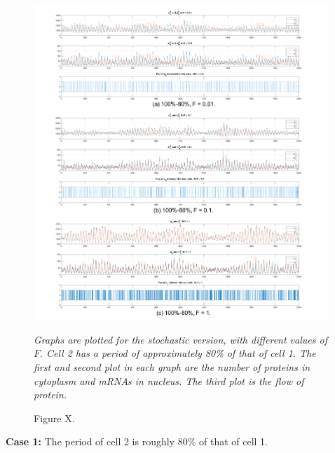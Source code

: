 \documentclass[12pt]{article}
\renewcommand{\(}{\left (}
\renewcommand{\)}{\right )}
\begin{document}
 \begin{figure}[!]
    \centering
	\begin{minipage}{0.99\textwidth}
		\centering
		\includegraphics[width=0.99\textwidth]{sto_two_80_100_compare.png}
		\caption*{\small Figure X.}
	\end{minipage}
	\footnotesize
	\emph{Graphs are plotted for the stochastic version, with different values of $F.$ Cell 2 has a period of approximately 80\% of that of cell 1. The first and second plot in each graph are the number of proteins in cytoplasm and mRNAs in nucleus. The third plot is the flow of protein.}
\end{figure}

\textbf{Case 1:} The period of cell 2 is roughly 80\% of that of cell 1.
\end{document}
